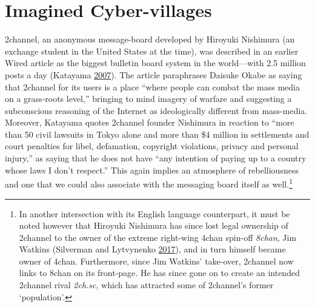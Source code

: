 \documentclass[10pt,british,A4paper,,openany]{memoir}
\begin{document}
\section{Imagined Cyber-villages}\label{imagined-cyber-villages}

2channel, an anonymous message-board developed by Hiroyuki Nishimura (an
exchange student in the United States at the time), was described in an
earlier Wired article as the biggest bulletin board system in the
world---with 2.5 million posts a day (Katayama
\protect\hyperlink{ref-katayama_2-channel_2007}{2007}). The article
paraphrases Daisuke Okabe as saying that 2channel for its users is a
place ``where people can combat the mass media on a grass-roots level,''
bringing to mind imagery of warfare and suggesting a subconscious
reasoning of the Internet as ideologically different from mass-media.
Moreover, Katayama quotes 2channel founder Nishimura in reaction to
``more than 50 civil lawsuits in Tokyo alone and more than \$4 million
in settlements and court penalties for libel, defamation, copyright
violations, privacy and personal injury,'' as saying that he does not
have ``any intention of paying up to a country whose laws I don't
respect.'' This again implies an atmosphere of rebelliousness and one
that we could also associate with the messaging board itself as
well.\footnote{In another intersection with its English language
  counterpart, it must be noted however that Hiroyuki Nishimura has
  since lost legal ownership of 2channel to the owner of the extreme
  right-wing 4chan spin-off \emph{8chan}, Jim Watkins (Silverman and
  Lytvynenko \protect\hyperlink{ref-silverman_meet_2017}{2017}), and in
  turn himself became owner of 4chan. Furthermore, since Jim Watkins'
  take-over, 2channel now links to 8chan on its front-page. He has since
  gone on to create an intended 2channel rival \emph{2ch.sc}, which has
  attracted some of 2channel's former `population'.}
\end{document}
